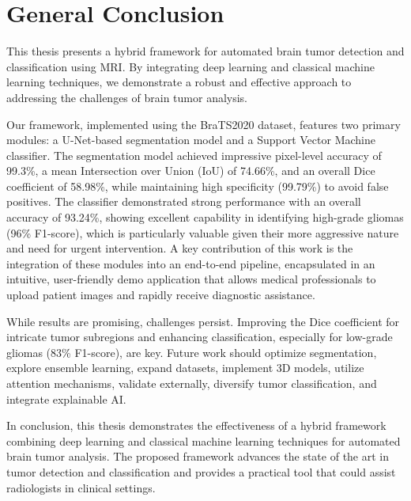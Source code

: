 \chapter*{General Conclusion}

This thesis presents a hybrid framework for automated brain tumor detection and classification using MRI. By integrating deep learning and classical machine learning techniques, we demonstrate a robust and effective approach to addressing the challenges of brain tumor analysis.

Our framework, implemented using the BraTS2020 dataset, features two primary modules: a U-Net-based segmentation model and a Support Vector Machine classifier. The segmentation model achieved impressive pixel-level accuracy of 99.3\%, a mean Intersection over Union (IoU) of 74.66\%, and an overall Dice coefficient of 58.98\%, while maintaining high specificity (99.79\%) to avoid false positives. The classifier demonstrated strong performance with an overall accuracy of 93.24\%, showing excellent capability in identifying high-grade gliomas (96\% F1-score), which is particularly valuable given their more aggressive nature and need for urgent intervention. A key contribution of this work is the integration of these modules into an end-to-end pipeline, encapsulated in an intuitive, user-friendly demo application that allows medical professionals to upload patient images and rapidly receive diagnostic assistance.

While results are promising, challenges persist. Improving the Dice coefficient for intricate tumor subregions and enhancing classification, especially for low-grade gliomas (83\% F1-score), are key. Future work should optimize segmentation, explore ensemble learning, expand datasets, implement 3D models, utilize attention mechanisms, validate externally, diversify tumor classification, and integrate explainable AI.

In conclusion, this thesis demonstrates the effectiveness of a hybrid framework combining deep learning and classical machine learning techniques for automated brain tumor analysis. The proposed framework advances the state of the art in tumor detection and classification and provides a practical tool that could assist radiologists in clinical settings.
